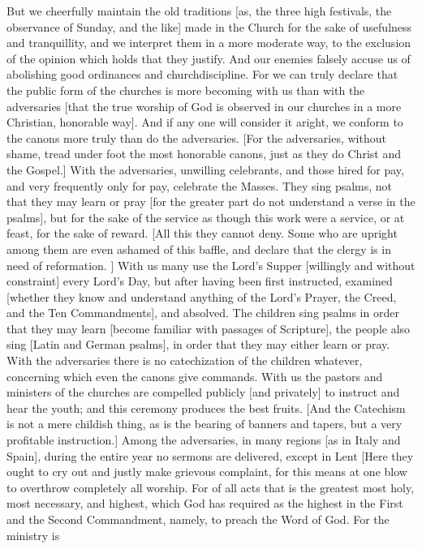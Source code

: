 But we cheerfully maintain the old traditions [as, the three high
festivals, the observance of Sunday, and the like] made in the Church
for the sake of usefulness and tranquillity, and we interpret them in
a more moderate way, to the exclusion of the opinion which holds that
they justify.  And our enemies falsely accuse us of abolishing good
ordinances and churchdiscipline.  For we can truly declare that the
public form of the churches is more becoming with us than with the
adversaries [that the true worship of God is observed in our churches
in a more Christian, honorable way].  And if any one will consider it
aright, we conform to the canons more truly than do the adversaries.
[For the adversaries, without shame, tread under foot the most
honorable canons, just as they do Christ and the Gospel.] With the
adversaries, unwilling celebrants, and those hired for pay, and very
frequently only for pay, celebrate the Masses.  They sing psalms, not
that they may learn or pray [for the greater part do not understand a
verse in the psalms], but for the sake of the service as though this
work were a service, or at feast, for the sake of reward.  [All this
they cannot deny.  Some who are upright among them are even ashamed
of this baffle, and declare that the clergy is in need of reformation.
] With us many use the Lord's Supper [willingly and without
constraint] every Lord's Day, but after having been first instructed,
examined [whether they know and understand anything of the Lord's
Prayer, the Creed, and the Ten Commandments], and absolved.  The
children sing psalms in order that they may learn [become familiar
with passages of Scripture], the people also sing [Latin and German
psalms], in order that they may either learn or pray.  With the
adversaries there is no catechization of the children whatever,
concerning which even the canons give commands.  With us the pastors
and ministers of the churches are compelled publicly [and privately]
to instruct and hear the youth; and this ceremony produces the best
fruits.  [And the Catechism is not a mere childish thing, as is the
bearing of banners and tapers, but a very profitable instruction.]
Among the adversaries, in many regions [as in Italy and Spain],
during the entire year no sermons are delivered, except in Lent [Here
they ought to cry out and justly make grievous complaint, for this
means at one blow to overthrow completely all worship.  For of all
acts that is the greatest most holy, most necessary, and highest,
which God has required as the highest in the First and the Second
Commandment, namely, to preach the Word of God.  For the ministry is

